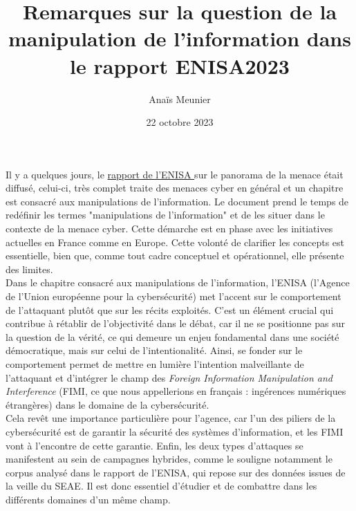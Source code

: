 \documentclass[a4paper]{article}
\title{Remarques sur la question de la manipulation de l'information dans le rapport ENISA2023}
\author{Anaïs Meunier} %
\date{22 octobre 2023}
\begin{document}
\maketitle                 

Il y a quelques jours, le \href{https://www.enisa.europa.eu/publications/enisa-threat-landscape-2023}{rapport de l'ENISA }sur le panorama de la menace était diffusé, celui-ci, très complet traite des menaces cyber en général et un chapitre est consacré aux manipulations de l'information. Le document prend le temps de redéfinir les termes "manipulations de l'information" et de les situer dans le contexte de la menace cyber. Cette démarche est en phase avec les initiatives actuelles en France comme en Europe. Cette volonté de clarifier les concepts est essentielle, bien que, comme tout cadre conceptuel et opérationnel, elle présente des limites.
\\

Dans le chapitre consacré aux manipulations de l'information, l'ENISA (l’Agence de l’Union européenne pour la cybersécurité) met l’accent sur le comportement de l’attaquant plutôt que sur les récits exploités. C'est un élément crucial qui contribue à rétablir de l'objectivité dans le débat, car il ne se positionne pas sur la question de la vérité, ce qui demeure un enjeu fondamental dans une société démocratique, mais sur celui de l'intentionalité. Ainsi, se fonder sur le comportement permet de mettre en lumière l'intention malveillante de l'attaquant et d'intégrer le champ des \textit{Foreign Information Manipulation and Interference} (FIMI, ce que nous appellerions en français : ingérences numériques étrangères) dans le domaine de la cybersécurité.
\\

Cela revêt une importance particulière pour l'agence, car l'un des piliers de la cybersécurité est de garantir la sécurité des systèmes d'information, et les FIMI vont à l'encontre de cette garantie. Enfin, les deux types d'attaques se manifestent au sein de campagnes hybrides, comme le souligne notamment le corpus analysé dans le rapport de l'ENISA, qui repose sur des données issues de la veille du SEAE. Il est donc essentiel d'étudier et de combattre dans les différents domaines d'un même champ.
\\
\end{document}
